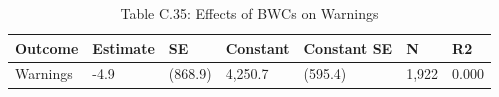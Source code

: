 \begin{table}

\caption{Table C.35: Effects of BWCs on Warnings}
\centering
\begin{tabular}[t]{lllllll}
\toprule
Outcome & Estimate & SE & Constant & Constant SE & N & R2\\
\midrule
Warnings & -4.9 & (868.9) & 4,250.7 & (595.4) & 1,922 & 0.000\\
\bottomrule
\end{tabular}
\end{table}
